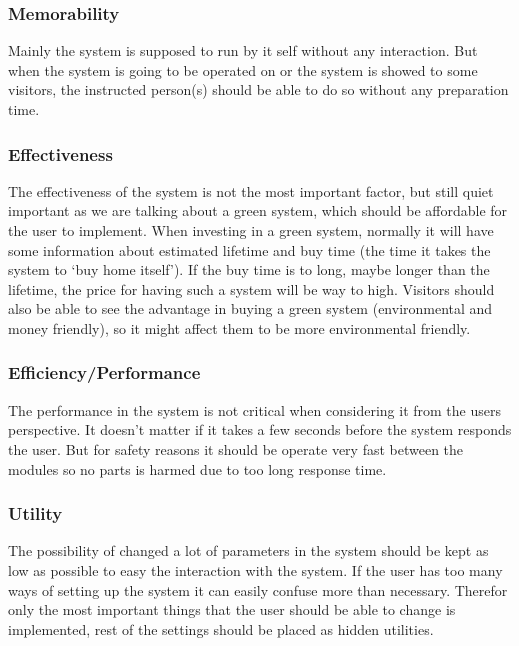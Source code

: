 \subsubsection{Memorability}
Mainly the system is supposed to run by it self without any interaction. But when the system is going to be operated on or the system is showed to some visitors, the instructed person(s) should be able to do so without any preparation time.
\subsubsection{Effectiveness}
The effectiveness of the system is not the most important factor, but still quiet important as we are talking about a green system, which should be
affordable for the user to implement. When investing in a green system, normally it will have some information about estimated lifetime and buy time (the time
it takes the system to `buy home itself'). If the buy time is to long, maybe longer than the lifetime, the price for having such a system will be way to high. 
Visitors should also be able to see the advantage in buying a green system (environmental and money friendly), so it might affect them to be more environmental friendly. 
\subsubsection{Efficiency/Performance}
The performance in the system is not critical when considering it from the users perspective. It doesn't matter if it takes a few seconds before the system responds the user. But for safety reasons it should be operate very fast between the modules so no parts is harmed due to too long response time.
\subsubsection{Utility}
The possibility of changed a lot of parameters in the system should be kept as low as possible to easy the interaction with the system. If the user has too many ways of setting up the system it can easily confuse more than necessary. Therefor only the most important things that the user should be able to change is implemented, rest of the settings should be placed as hidden utilities. 

